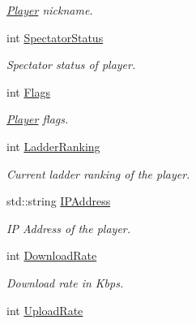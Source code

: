 \begin{DoxyCompactItemize}
\begin{DoxyCompactList}\small\item\em \hyperlink{structPlayer}{Player} nickname. \end{DoxyCompactList}\item 
\hypertarget{structPlayer_a2037601661fb699454a88b5649485b30}{int \hyperlink{structPlayer_a2037601661fb699454a88b5649485b30}{Spectator\-Status}}\label{structPlayer_a2037601661fb699454a88b5649485b30}

\begin{DoxyCompactList}\small\item\em Spectator status of player. \end{DoxyCompactList}\item 
\hypertarget{structPlayer_aa151b994eedc8ba67b3fd48905db5ac0}{int \hyperlink{structPlayer_aa151b994eedc8ba67b3fd48905db5ac0}{Flags}}\label{structPlayer_aa151b994eedc8ba67b3fd48905db5ac0}

\begin{DoxyCompactList}\small\item\em \hyperlink{structPlayer}{Player} flags. \end{DoxyCompactList}\item 
\hypertarget{structPlayer_a25fe69852f0e38f541ad615cd59877ef}{int \hyperlink{structPlayer_a25fe69852f0e38f541ad615cd59877ef}{Ladder\-Ranking}}\label{structPlayer_a25fe69852f0e38f541ad615cd59877ef}

\begin{DoxyCompactList}\small\item\em Current ladder ranking of the player. \end{DoxyCompactList}\item 
\hypertarget{structPlayer_a388787a2218deeaf7318f0fbbd3f5d0f}{std\-::string \hyperlink{structPlayer_a388787a2218deeaf7318f0fbbd3f5d0f}{I\-P\-Address}}\label{structPlayer_a388787a2218deeaf7318f0fbbd3f5d0f}

\begin{DoxyCompactList}\small\item\em I\-P Address of the player. \end{DoxyCompactList}\item 
\hypertarget{structPlayer_a7fcee993ceed3c2b737782bc549e11bf}{int \hyperlink{structPlayer_a7fcee993ceed3c2b737782bc549e11bf}{Download\-Rate}}\label{structPlayer_a7fcee993ceed3c2b737782bc549e11bf}

\begin{DoxyCompactList}\small\item\em Download rate in Kbps. \end{DoxyCompactList}\item 
\hypertarget{structPlayer_a28f9a31a54ac8ea0658a6b234523b29d}{int \hyperlink{structPlayer_a28f9a31a54ac8ea0658a6b234523b29d}{Upload\-Rate}}\label{structPlayer_a28f9a31a54ac8ea0658a6b234523b29d}


\end{DoxyCompactItemize}
